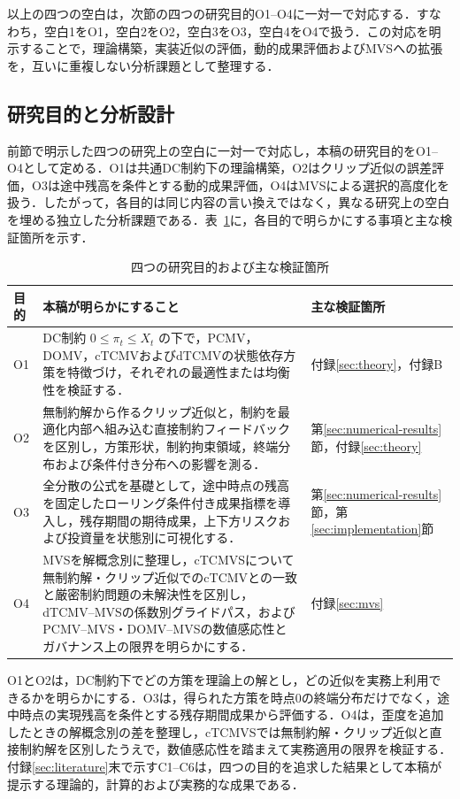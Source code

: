 \documentclass[10pt,a4paper]{article}
\theoremstyle{plain}
\theoremstyle{definition}
\begin{document}
以上の四つの空白は，次節の四つの研究目的O1--O4に一対一で対応する．すなわち，空白1をO1，空白2をO2，空白3をO3，空白4をO4で扱う．この対応を明示することで，理論構築，実装近似の評価，動的成果評価およびMVSへの拡張を，互いに重複しない分析課題として整理する．

\subsection{研究目的と分析設計}

前節で明示した四つの研究上の空白に一対一で対応し，本稿の研究目的をO1--O4として定める．O1は共通DC制約下の理論構築，O2はクリップ近似の誤差評価，O3は途中残高を条件とする動的成果評価，O4はMVSによる選択的高度化を扱う．したがって，各目的は同じ内容の言い換えではなく，異なる研究上の空白を埋める独立した分析課題である．表~\ref{tab:objectives}に，各目的で明らかにする事項と主な検証箇所を示す．

\begin{table}[htbp]
\centering\small
\caption{四つの研究目的および主な検証箇所}
\label{tab:objectives}
\begin{tabularx}{\textwidth}{p{12mm}p{100mm}X}
\toprule
目的 & 本稿が明らかにすること & 主な検証箇所 \\
\midrule
O1
& DC制約 $0\leq\pi_t\leq X_t$ の下で，PCMV，DOMV，cTCMVおよびdTCMVの状態依存方策を特徴づけ，それぞれの最適性または均衡性を検証する．
& 付録\ref{sec:theory}，付録B \\
O2
& 無制約解から作るクリップ近似と，制約を最適化内部へ組み込む直接制約フィードバックを区別し，方策形状，制約拘束領域，終端分布および条件付き分布への影響を測る．
& 第\ref{sec:numerical-results}節，付録\ref{sec:theory} \\
O3
& 全分散の公式を基礎として，途中時点の残高を固定したローリング条件付き成果指標を導入し，残存期間の期待成果，上下方リスクおよび投資量を状態別に可視化する．
& 第\ref{sec:numerical-results}節，第\ref{sec:implementation}節 \\
O4
& MVSを解概念別に整理し，cTCMVSについて無制約解・クリップ近似でのcTCMVとの一致と厳密制約問題の未解決性を区別し，dTCMV--MVSの係数別グライドパス，およびPCMV--MVS・DOMV--MVSの数値感応性とガバナンス上の限界を明らかにする．
& 付録\ref{sec:mvs} \\
\bottomrule
\end{tabularx}
\end{table}

O1とO2は，DC制約下でどの方策を理論上の解とし，どの近似を実務上利用できるかを明らかにする．O3は，得られた方策を時点0の終端分布だけでなく，途中時点の実現残高を条件とする残存期間成果から評価する．O4は，歪度を追加したときの解概念別の差を整理し，cTCMVSでは無制約解・クリップ近似と直接制約解を区別したうえで，数値感応性を踏まえて実務適用の限界を検証する．付録\ref{sec:literature}末で示すC1--C6は，四つの目的を追求した結果として本稿が提示する理論的，計算的および実務的な成果である．
\end{document}
